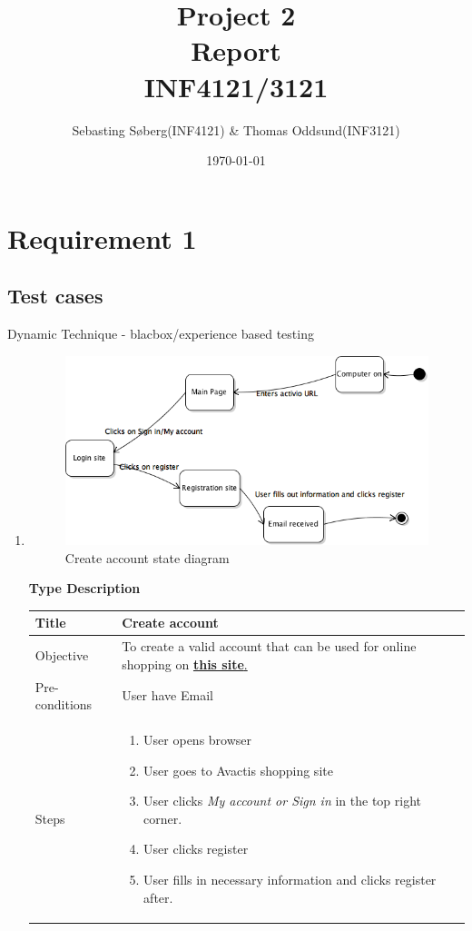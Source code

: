 \documentclass[UKenglish,12pt]{article}
\title{Project 2 \\ Report \\ INF4121/3121} %
\date{\today} %
\author{Sebasting Søberg(INF4121) \& Thomas Oddsund(INF3121)}
\begin{document}
\maketitle %

\section{Requirement 1}
\subsection{Test cases}
Dynamic Technique - blacbox/experience based testing
\begin{enumerate}%
\item
\begin{figure}[!h]
\centering
\includegraphics[scale=0.6,keepaspectratio]{Images/CreateAccount.png}
\caption{Create account state diagram}
\end{figure}
\newpage
\textbf{\hspace{0.3cm}Type\hspace{4.4cm} Description}
\newline \vspace{0.2cm}
\begin{tabular}{| p{5cm} | p{10cm} | }
	\hline
	 Title & Create account\\ \hline
	 Objective & To create a valid account that can be used for online shopping on \href{http://demo.avactis.com/4.7.9/}{\textbf{this site}.} \\ \hline
	 Pre-conditions & User have Email\\ \hline
	 Steps & \begin{enumerate} \item User opens browser \item User goes to Avactis shopping site \item User clicks \textit{My account or  Sign in} in the top right corner. \item User clicks register \item User fills in necessary information and clicks register after.\end{enumerate} \\ \hline

\end{tabular}
\end{enumerate}
\end{document}
